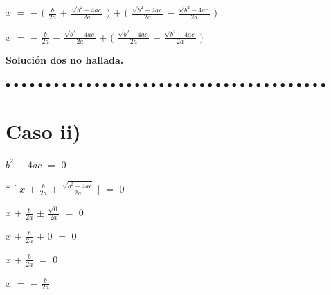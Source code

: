 \documentclass[12pt]{article}
\newenvironment{MyColorPar}[1]{%
    \leavevmode\color{#1}\ignorespaces%
}{%
}%
\begin{document}
$x$  $=$ {\LARGE{$-$}} $\bigg($ {\LARGE{$\frac{b}{2a}$ $+$ $\frac{\sqrt{b^{2}-4ac}}{2a}$}} $\bigg)$ $+$ $\bigg($ {\LARGE{$\frac{\sqrt{b^{2}-4ac}}{2a}$}} $-$ {\LARGE{$\frac{\sqrt{b^{2}-4ac}}{2a}$}} $\bigg)$ \vspace{0.5cm}

$x$  $=$ {\LARGE{$-$}} {\LARGE{$\frac{b}{2a}$ $-$ $\frac{\sqrt{b^{2}-4ac}}{2a}$}} $+$ $\bigg($ {\LARGE{$\frac{\sqrt{b^{2}-4ac}}{2a}$}} $-$ {\LARGE{$\frac{\sqrt{b^{2}-4ac}}{2a}$}} $\bigg)$ \vspace{0.5cm}

\begin{MyColorPar}{Thunderbird}
\bfseries Solución dos no hallada.
\end{MyColorPar} \vspace{0.2cm}

\begin{MyColorPar}{pakistangreen}
$\bullet$ $\bullet$ $\bullet$ $\bullet$ $\bullet$ $\bullet$ $\bullet$ $\bullet$ $\bullet$ $\bullet$ $\bullet$ $\bullet$ $\bullet$ $\bullet$ $\bullet$ $\bullet$ $\bullet$ $\bullet$ $\bullet$ $\bullet$ $\bullet$ $\bullet$ $\bullet$ $\bullet$ $\bullet$ $\bullet$ $\bullet$ $\bullet$ $\bullet$ $\bullet$ $\bullet$ $\bullet$ $\bullet$ $\bullet$ $\bullet$ $\bullet$ $\bullet$ $\bullet$ $\bullet$ $\bullet$ 
\end{MyColorPar} \vspace{.5cm}

\section*{{\textsf{Caso ii)}}}
\hspace{4cm} {\Large{$b^{2}$ $-$ $4ac$ $=$ $0$}} \vspace{0.5cm}

\hspace{3cm} * $\bigg [$ $x$ $+$ {\LARGE{$\frac{b}{2a}$}} $\pm$ {\LARGE{$\frac{\sqrt{b^{2}-4ac}}{2a}$}} $\bigg ]$ $=$ $0$ \vspace{0.5cm}
 
\hspace{3.5cm} $x$ $+$ {\LARGE{$\frac{b}{2a}$}} $\pm$ {\LARGE{$\frac{\sqrt{0}}{2a}$}} $=$ $0$

\hspace{3.5cm} $x$ $+$ {\LARGE{$\frac{b}{2a}$}} $\pm$ $0$ $=$ $0$

\hspace{3.5cm} $x$ $+$ {\LARGE{$\frac{b}{2a}$}} $=$ $0$

\hspace{3.5cm} $x$ $=$ $-$ {\LARGE{$\frac{b}{2a}$}}
\end{document}
